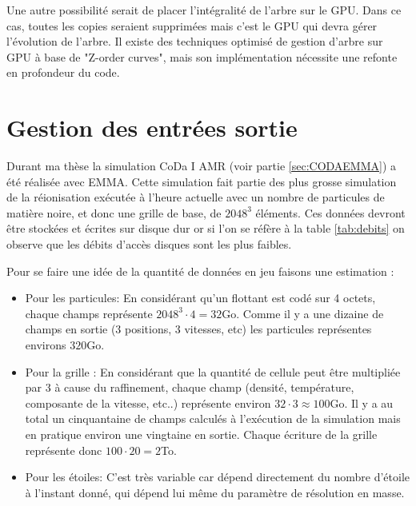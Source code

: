 Une autre possibilité serait de placer l'intégralité de l'arbre sur le \ac{GPU}.
Dans ce cas, toutes les copies seraient supprimées mais c'est le \ac{GPU} qui devra gérer l'évolution de l'arbre. 
Il existe des techniques optimisé de gestion d'arbre sur \ac{GPU} à base de "Z-order curves", mais son implémentation nécessite une refonte en profondeur du code.





\section{Gestion des entrées sortie}
\label{sec:io}

Durant ma thèse la simulation CoDa I AMR (voir partie \ref{sec:CODAEMMA}) a été réalisée avec EMMA.
Cette simulation fait partie des plus grosse simulation de la réionisation exécutée à l'heure actuelle avec un nombre de particules de matière noire, et donc une grille de base, de $2048^3$ éléments.
Ces données devront être stockées et écrites sur disque dur or si l'on se réfère à la table \ref{tab:debits} on observe que les débits d'accès disques sont les plus faibles.

Pour se faire une idée de la quantité de données en jeu faisons une estimation : 

\begin{itemize}
\item Pour les particules:
En considérant qu'un flottant est codé sur 4 octets, chaque champs représente $2048^3 \cdot 4 = 32$Go.
Comme il y a une dizaine de champs en sortie (3 positions, 3 vitesses, etc) les particules représentes environs $320$Go.

\item Pour la grille :
En considérant que la quantité de cellule peut être multipliée par 3 à cause du raffinement, chaque champ (densité, température, composante de la vitesse, etc..) représente environ $32 \cdot 3 \approx 100$Go.
Il y a au total un cinquantaine de champs calculés à l'exécution de la simulation mais en pratique environ une vingtaine en sortie.
Chaque écriture de la grille représente donc $100\cdot 20 =2$To.

\item Pour les étoiles:
C'est très variable car dépend directement du nombre d'étoile à l'instant donné, qui dépend lui même du paramètre de résolution en masse.
\end{itemize}

